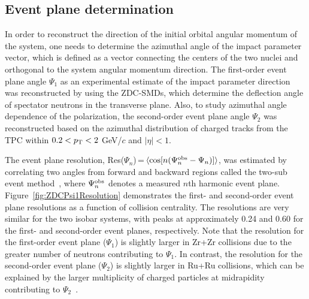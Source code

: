 \documentclass[preprint,5p,times,twocolumn]{elsarticle}
\begin{document}
\subsection{Event plane determination}
 
In order to reconstruct the direction of the initial orbital angular momentum of the system, one needs to determine the azimuthal angle of the impact parameter vector, which is defined as a vector connecting the centers of the two nuclei and orthogonal to the system angular momentum direction.
The first-order event plane angle $\Psi_{1}$ as an experimental estimate of the impact parameter direction~\cite{Voloshin:2016ppr} was reconstructed by using the ZDC-SMDs, which determine the deflection angle of spectator neutrons in the transverse plane.
Also, to study azimuthal angle dependence of the polarization, the second-order event plane angle $\Psi_{2}$ was reconstructed based on the azimuthal distribution of charged tracks from the TPC within $0.2<p_{\rm T}<2$ GeV/$c$ and $|\eta|<1$.


The event plane resolution, Res($\Psi_{n}$)\,=\,$\langle \cos[n(\Psi_{n}^{\rm obs}-\Psi_{n})]\rangle$, was estimated by correlating two angles from forward and backward regions called the two-sub event method~\cite{Poskanzer:1998yz}, where $\Psi_{n}^{\rm obs}$ denotes a measured $n$th harmonic event plane. 
Figure~\ref{fig:ZDCPsi1Resolution} demonstrates the first- and second-order event plane resolutions as a function of collision centrality. 
The resolutions are very similar for the two isobar systems, with peaks at approximately 0.24 and 0.60 for the first- and second-order event planes, respectively. 
Note that the resolution for the first-order event plane ($\Psi_1$) is slightly larger in Zr+Zr collisions due to the greater number of neutrons contributing to $\Psi_1$. In contrast, the resolution for the second-order event plane ($\Psi_2$) is slightly larger in Ru+Ru collisions, which can be explained by the larger multiplicity of charged particles at midrapidity contributing to $\Psi_2$~\cite{STAR:2021mii}.
\end{document}
